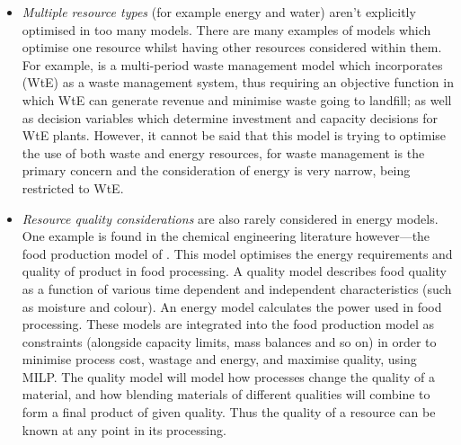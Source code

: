\begin{itemize}
	\item \emph{Multiple resource types} (for example energy and water) aren't explicitly optimised in too many models. There are many examples of models which optimise one resource whilst having other resources considered within them. For example, \citet{Lu2009} is a multi-period waste management model which incorporates (WtE) as a waste management system, thus requiring an objective function in which WtE can generate revenue and minimise waste going to landfill; as well as decision variables which determine investment and capacity decisions for WtE plants. However, it cannot be said that this model is trying to optimise the use of both waste and energy resources, for waste management is the primary concern and the consideration of energy is very narrow, being restricted to WtE.
	\item \emph{Resource quality considerations} are also rarely considered in energy models. One example is found in the chemical engineering literature however---the food production model of \citet{Mehdizadeh2011}. This model optimises the energy requirements and quality of product in food processing. A quality model describes food quality as a function of various time dependent and independent characteristics (such as moisture and colour). An energy model calculates the power used in food processing. These models are integrated into the food production model as constraints (alongside capacity limits, mass balances and so on) in order to minimise process cost, wastage and energy, and maximise quality, using MILP. The quality model will model how processes change the quality of a material, and how blending materials of different qualities will combine to form a final product of given quality. Thus the quality of a resource can be known at any point in its processing. 
\end{itemize}

